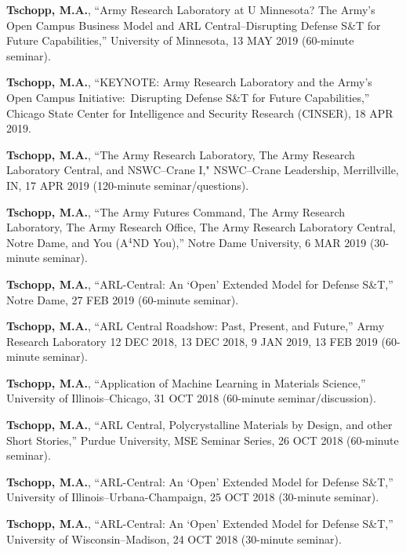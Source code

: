 \begin{cvlist}
\item
\textbf{Tschopp, M.A.}, ``Army Research Laboratory at U Minnesota? The Army's Open Campus Business Model and ARL Central--Disrupting Defense S\&T for Future Capabilities,'' University of Minnesota, 13 MAY 2019 (60-minute seminar).

\item
\textbf{Tschopp, M.A.}, ``KEYNOTE: Army Research Laboratory and the Army's Open Campus Initiative:~Disrupting Defense S\&T for Future Capabilities,'' Chicago State Center for Intelligence and Security Research (CINSER), 18 APR 2019.

\item
\textbf{Tschopp, M.A.}, ``The Army Research Laboratory, The Army Research Laboratory Central, and NSWC--Crane I," NSWC--Crane Leadership, Merrillville, IN, 17 APR 2019 (120-minute seminar/questions).

\item
\textbf{Tschopp, M.A.}, ``The Army Futures Command, The Army Research Laboratory, The Army Research Office, The Army Research Laboratory Central, Notre Dame, and You (A$^4$ND You),'' Notre Dame University, 6 MAR 2019 (30-minute seminar).

\item
\textbf{Tschopp, M.A.}, ``ARL-Central: An `Open' Extended Model for Defense S\&T,'' Notre Dame, 27 FEB 2019 (60-minute seminar).

\item
\textbf{Tschopp, M.A.}, ``ARL Central Roadshow: Past, Present, and Future,'' Army Research Laboratory 12 DEC 2018, 13 DEC 2018, 9 JAN 2019, 13 FEB 2019 (60-minute seminar).

\item
\textbf{Tschopp, M.A.}, ``Application of Machine Learning in Materials Science,'' University of Illinois--Chicago, 31 OCT 2018 (60-minute seminar/discussion).

\item
\textbf{Tschopp, M.A.}, ``ARL Central, Polycrystalline Materials by Design, and other Short Stories,'' Purdue University, MSE Seminar Series, 26 OCT 2018  (60-minute seminar).

\item
\textbf{Tschopp, M.A.}, ``ARL-Central: An `Open' Extended Model for Defense S\&T,'' University of Illinois--Urbana-Champaign, 25 OCT 2018 (30-minute seminar).

\item
\textbf{Tschopp, M.A.}, ``ARL-Central: An `Open' Extended Model for Defense S\&T,'' University of Wisconsin--Madison, 24 OCT 2018 (30-minute seminar).


\end{cvlist}
